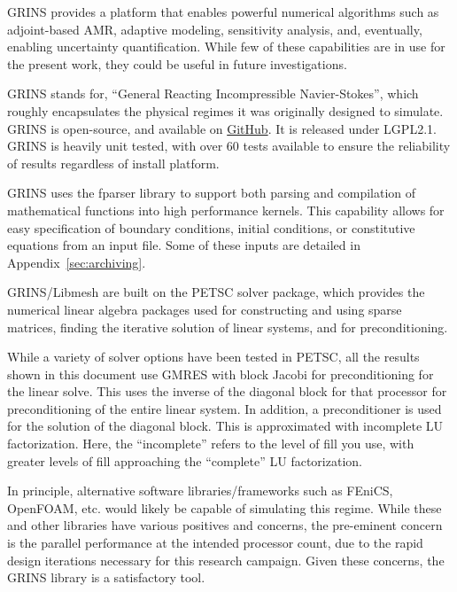 GRINS provides a platform that enables powerful numerical algorithms
such as adjoint-based AMR, adaptive modeling, sensitivity analysis,
and, eventually, enabling uncertainty quantification. While few of these
capabilities are in use for the present work, they could be useful in
future investigations. 

GRINS stands for, ``General Reacting Incompressible Navier-Stokes'',
which roughly encapsulates the physical regimes it was originally
designed to simulate. GRINS is open-source, and available on
\hyperref[www.github.com/grinsfem/grins]{GitHub}. It is released 
under LGPL2.1.  GRINS is heavily unit tested, with over 60 tests
available to ensure the reliability of results regardless of install
platform. 


GRINS uses the fparser\cite{fparser}
library to support both parsing and compilation of mathematical
functions into high performance kernels. This capability allows for
easy specification of boundary conditions, initial conditions, or
constitutive equations from an input file. Some of these inputs are
detailed in Appendix~\ref{sec:archiving}. 

GRINS/Libmesh are built on the PETSC\cite{petsc} solver package, which
provides the numerical linear algebra packages used for constructing and
using sparse matrices, finding the iterative solution of linear systems,
and for preconditioning.  

While a variety of solver options have been tested in PETSC, all the
results shown in this document use GMRES with block Jacobi for
preconditioning\cite{Saad:2003} for the linear solve. This uses the
inverse of the diagonal block for that processor for preconditioning of
the entire linear system. In addition, a preconditioner is used for the
solution of the diagonal block. This is approximated with incomplete LU
factorization\cite{?}. Here, the ``incomplete'' refers
to the level of fill you use, with greater levels of fill approaching
the ``complete'' LU factorization. 

In principle, alternative software libraries/frameworks such as
FEniCS\cite{fenics}, OpenFOAM\cite{openfoam}, etc. would likely be
capable of simulating this regime. While these and other libraries have
various positives and concerns, the pre-eminent concern is the parallel
performance at the intended processor count, due to the rapid
design iterations necessary for this research campaign. Given these concerns,
the GRINS library is a satisfactory tool. 

